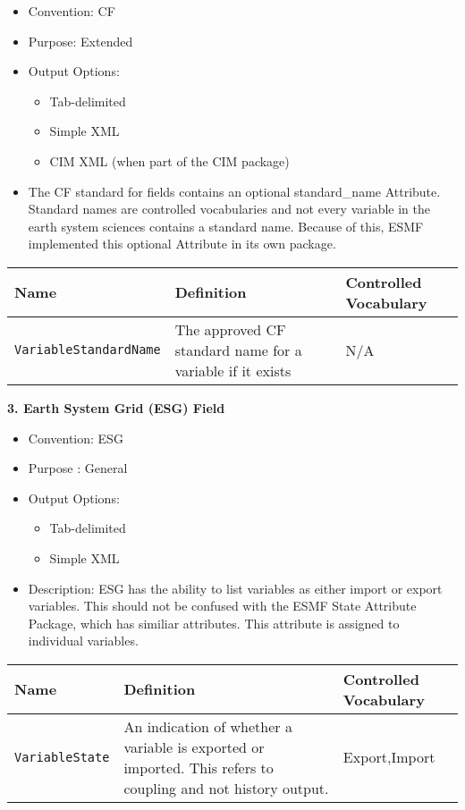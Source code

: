 \begin{itemize}
    \item Convention: CF
    \item Purpose: Extended
    \item Output Options: 
    \begin{itemize}
        \item Tab-delimited
        \item Simple XML
        \item CIM XML (when part of the CIM package)
    \end{itemize} 
    \item The CF standard for fields contains an optional standard\_name Attribute. Standard names are controlled vocabularies and not every variable in the earth system sciences contains a standard name. Because of this, ESMF implemented this optional Attribute in its own package.
\end{itemize}

\begin{tabular}{|p{8cm}|p{20cm}|p{10cm}|}
    {\bf Name } & {\bf Definition} & {\bf Controlled Vocabulary} \\
    \hline\hline
    {\tt VariableStandardName} & The approved CF standard name for a variable if it exists &  N/A\\
\end{tabular}



\vspace{.20in}
{\bf 3. Earth System Grid (ESG) Field}

\begin{itemize}
    \item Convention: ESG
    \item Purpose : General
    \item Output Options: 
    \begin{itemize}
        \item Tab-delimited
        \item Simple XML
    \end{itemize}
    \item Description: ESG has the ability to list variables as either import or export variables. This should not be confused with the ESMF State Attribute Package, which has similiar attributes. This attribute is assigned to individual variables.  
\end{itemize}

\begin{tabular}{|p{8cm}|p{20cm}|p{10cm}|}
     {\bf Name } & {\bf Definition} & {\bf Controlled Vocabulary} \\
     \hline\hline
     {\tt VariableState} & An indication of whether a variable is exported or imported. This refers to coupling and not history output. & Export,Import\\
\end{tabular}




